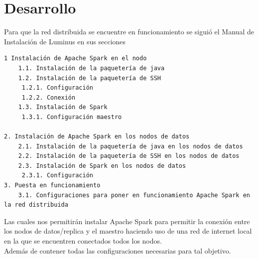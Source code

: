 \section{Desarrollo}\label{seccion3}
Para que la red distribuida se encuentre en funcionamiento se siguió el Manual de Instalación de Luminus 
en sus secciones 
\begin{verbatim}
1 Instalación de Apache Spark en el nodo
	1.1. Instalación de la paquetería de java 
	1.2. Instalación de la paquetería de SSH	
	 1.2.1. Configuración
	 1.2.2. Conexión
	1.3. Instalación de Spark
     1.3.1. Configuración maestro

2. Instalación de Apache Spark en los nodos de datos
	2.1. Instalación de la paquetería de java en los nodos de datos
	2.2. Instalación de la paquetería de SSH en los nodos de datos
	2.3. Instalación de Spark en los nodos de datos
     2.3.1. Configuración 
3. Puesta en funcionamiento
	3.1. Configuraciones para poner en funcionamiento Apache Spark en la red distribuida
\end{verbatim}
Las cuales nos permitirán instalar Apache Spark para permitir la conexión entre los nodos de datos/replica y el maestro haciendo uso de una red de internet local en la que se encuentren conectados todos los nodos.
\\
Además de contener todas las configuraciones necesarias para tal objetivo.  
